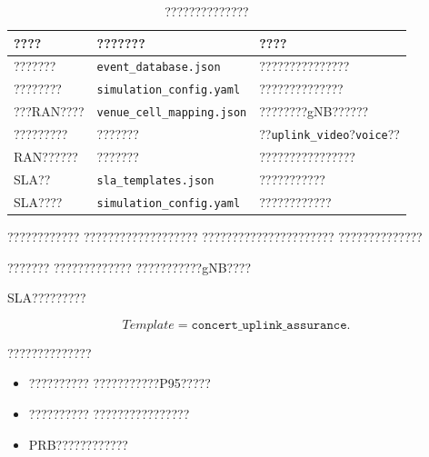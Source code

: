 \begin{table}[H]
    \centering
    \caption{??????????????}
    \label{tab:translation_data_source_reduced}
    \small
    \renewcommand{\arraystretch}{1.25}
    \begin{tabularx}{\textwidth}{
        >{\raggedright\arraybackslash}p{}
        >{\raggedright\arraybackslash}p{}
        >{\raggedright\arraybackslash}X
    }
        \toprule
        ???? & ??????? & ???? \\
        \midrule

        ???????
        & \texttt{event\_database.json}
        & ???????????????
        \\

        ????????
        & \texttt{simulation\_config.yaml}
        & ??????????????
        \\

        ???RAN????
        & \texttt{venue\_cell\_mapping.json}
        & ????????gNB??????
        \\

        ?????????
        & ???????
        & ??\texttt{uplink\_video}?\texttt{voice}??
        \\

        RAN??????
        & ???????
        & ????????????????
        \\

        SLA??
        & \texttt{sla\_templates.json}
        & ???????????
        \\

        SLA????
        & \texttt{simulation\_config.yaml}
        & ????????????
        \\

        \bottomrule
    \end{tabularx}
\end{table}

????????????
???????????????????
??????????????????????
??????????????

???????
?????????????
???????????gNB????

SLA?????????

\begin{equation}
Template
=
\texttt{concert\_uplink\_assurance}.
\label{eq:concert_sla_template_reduced}
\end{equation}

??????????????

\begin{itemize}
    \item ??????????
    ???????????P95?????
    \item ??????????
    ????????????????
    \item PRB????????????
\end{itemize}

